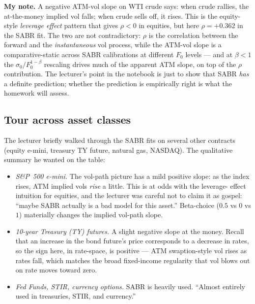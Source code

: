 \begin{checkpoint}
\textbf{My note.} A negative ATM-vol slope on WTI crude says: when
crude rallies, the at-the-money implied vol falls; when crude sells
off, it rises. This is the equity-style \emph{leverage effect} pattern
that gives $\rho < 0$ in equities, but here $\rho = +0.362$ in the
SABR fit. The two are not contradictory: $\rho$ is the
correlation between the forward and the \emph{instantaneous} vol
process, while the ATM-vol slope is a comparative-static across SABR
calibrations at different $F_0$ levels --- and at $\beta < 1$ the
$\sigma_0 / F_0^{1-\beta}$ rescaling drives much of the apparent ATM
slope, on top of the $\rho$ contribution. The lecturer's point in
the notebook is just to show that SABR \emph{has} a definite
prediction; whether the prediction is empirically right is what the
homework will assess.
\end{checkpoint}

\subsection{Tour across asset classes}\label{L7-sec:assettour}

The lecturer briefly walked through the SABR fits on several other
contracts (equity e-mini, treasury TY future, natural gas, NASDAQ).
The qualitative summary he wanted on the table:

\begin{itemize}
  \item \emph{S\&P~500 e-mini.} The vol-path picture has a mild
        positive slope: as the index rises, ATM implied vols
        \emph{rise} a little. This is at odds with the leverage-
        effect intuition for equities, and the lecturer was careful
        not to claim it as gospel: ``maybe SABR actually is a bad
        model for this asset.'' Beta-choice ($0.5$ vs $0$ vs $1$)
        materially changes the implied vol-path slope.
  \item \emph{10-year Treasury (TY) futures.} A slight negative
        slope at the money. Recall that an increase in the bond
        future's price corresponds to a decrease in rates, so the
        sign here, in rate-space, is positive --- ATM swaption-style
        vol rises as rates fall, which matches the broad fixed-income
        regularity that vol blows out on rate moves toward zero.
  \item \emph{Fed Funds, STIR, currency options.} SABR is heavily
        used. ``Almost entirely used in treasuries, STIR, and
        currency.''
\end{itemize}

